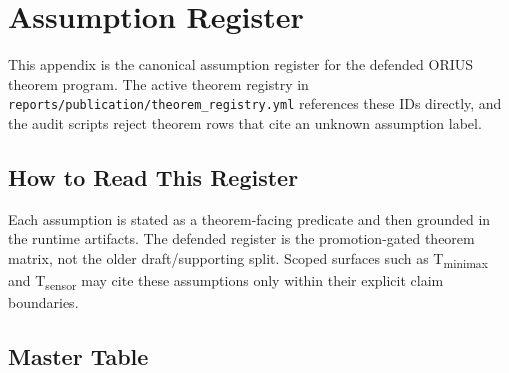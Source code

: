 \chapter{Assumption Register}
\label{app:assumptions}

This appendix is the canonical assumption register for the defended ORIUS
theorem program.  The active theorem registry in
\texttt{reports/publication/theorem\_registry.yml} references these IDs
directly, and the audit scripts reject theorem rows that cite an unknown
assumption label.

\section{How to Read This Register}

Each assumption is stated as a theorem-facing predicate and then grounded in
the runtime artifacts.  The defended register is the promotion-gated theorem
matrix, not the older draft/supporting split.  Scoped surfaces such as
T\textsubscript{minimax} and T\textsubscript{sensor} may cite these assumptions
only within their explicit claim boundaries.

\section{Master Table}

